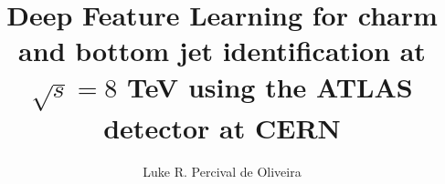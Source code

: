 \title{Deep Feature Learning for charm and bottom jet identification at $\sqrt{s} = 8$ TeV using the ATLAS detector at CERN}
\author{Luke R. Percival de Oliveira}




